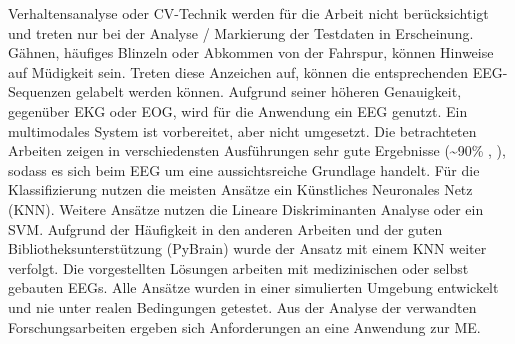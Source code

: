 Verhaltensanalyse oder CV-Technik werden für die Arbeit nicht berücksichtigt und treten nur bei der Analyse / Markierung der Testdaten in Erscheinung. Gähnen, häufiges Blinzeln oder Abkommen von der Fahrspur, können Hinweise auf Müdigkeit sein. Treten diese Anzeichen auf, können die entsprechenden EEG-Sequenzen gelabelt werden können. 
Aufgrund seiner höheren Genauigkeit, gegenüber EKG oder EOG, wird für die Anwendung ein EEG genutzt. Ein multimodales System ist vorbereitet, aber nicht umgesetzt. Die betrachteten Arbeiten zeigen in verschiedensten Ausführungen sehr gute Ergebnisse (\textasciitilde 90\% \cite{Lin05eeg-baseddrowsiness}, \cite{Subasi:2005:ARA:1707423.1707550}), sodass es sich beim EEG um eine aussichtsreiche Grundlage handelt. 
Für die Klassifizierung nutzen die meisten Ansätze ein Künstliches Neuronales Netz  (KNN)\cite{Subasi:2005:ARA:1707423.1707550}\cite{Vuckovic2002349}\cite{wilson_890161}\cite{khalifa_893852}. Weitere Ansätze nutzen die Lineare Diskriminanten Analyse\cite{Vicente_6164509}\cite{Khushaba_5580017} oder ein SVM\cite{Park:2009:DDD:1667780.1667798}\cite{zhang_6513058}. Aufgrund der Häufigkeit in den anderen Arbeiten und der guten Bibliotheksunterstützung (PyBrain) wurde der Ansatz mit einem KNN weiter verfolgt. Die vorgestellten Lösungen arbeiten mit medizinischen oder selbst gebauten EEGs. Alle Ansätze wurden in einer simulierten Umgebung entwickelt und nie unter realen Bedingungen getestet. Aus der Analyse der verwandten Forschungsarbeiten ergeben sich Anforderungen an eine Anwendung zur \acl{ME}. 